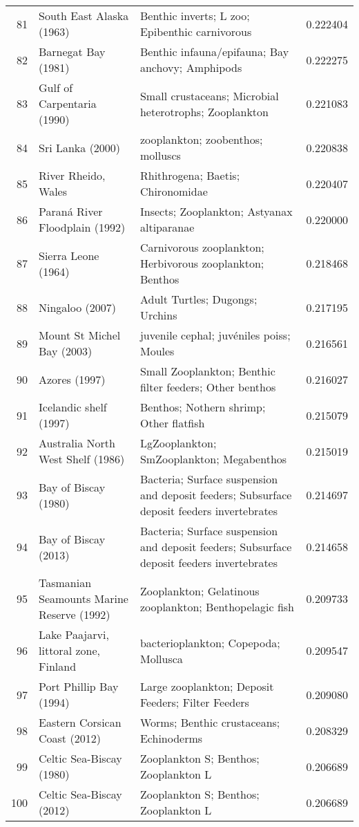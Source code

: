 \begin{tabular}{rllr}
81 & South East Alaska (1963) & Benthic inverts; L zoo; Epibenthic carnivorous & 0.222404 \\
82 & Barnegat Bay (1981) & Benthic infauna/epifauna; Bay anchovy; Amphipods & 0.222275 \\
83 & Gulf of Carpentaria (1990) & Small crustaceans; Microbial heterotrophs; Zooplankton & 0.221083 \\
84 & Sri Lanka (2000) & zooplankton; zoobenthos; molluscs & 0.220838 \\
85 & River Rheido, Wales &  Rhithrogena;  Baetis;  Chironomidae & 0.220407 \\
86 & Paraná River Floodplain (1992) & Insects; Zooplankton; Astyanax altiparanae & 0.220000 \\
87 & Sierra Leone (1964) & Carnivorous zooplankton; Herbivorous zooplankton; Benthos & 0.218468 \\
88 & Ningaloo (2007) & Adult Turtles; Dugongs; Urchins & 0.217195 \\
89 & Mount St Michel Bay (2003) & juvenile cephal; juvéniles poiss; Moules & 0.216561 \\
90 & Azores (1997) & Small Zooplankton; Benthic filter feeders; Other benthos & 0.216027 \\
91 & Icelandic shelf (1997) & Benthos; Nothern shrimp; Other flatfish & 0.215079 \\
92 & Australia North West Shelf (1986) & LgZooplankton; SmZooplankton; Megabenthos & 0.215019 \\
93 & Bay of Biscay (1980) & Bacteria; Surface suspension and deposit feeders; Subsurface deposit feeders invertebrates & 0.214697 \\
94 & Bay of Biscay (2013) & Bacteria; Surface suspension and deposit feeders; Subsurface deposit feeders invertebrates & 0.214658 \\
95 & Tasmanian Seamounts Marine Reserve (1992) & Zooplankton; Gelatinous zooplankton; Benthopelagic fish & 0.209733 \\
96 & Lake Paajarvi, littoral zone, Finland & bacterioplankton; Copepoda; Mollusca & 0.209547 \\
97 & Port Phillip Bay (1994) & Large zooplankton; Deposit Feeders; Filter Feeders & 0.209080 \\
98 & Eastern Corsican Coast (2012) & Worms; Benthic crustaceans; Echinoderms & 0.208329 \\
99 & Celtic Sea-Biscay (1980) & Zooplankton S; Benthos; Zooplankton L & 0.206689 \\
100 & Celtic Sea-Biscay (2012) & Zooplankton S; Benthos; Zooplankton L & 0.206689 \\

\end{tabular}
